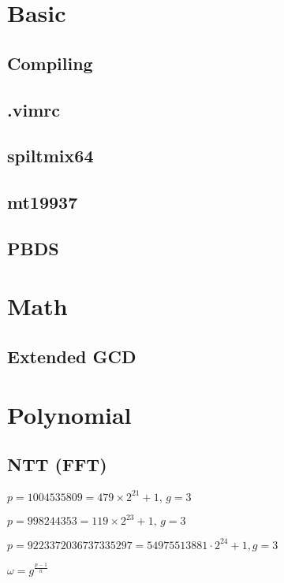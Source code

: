 \documentclass[10pt,a4paper,twocolumn,oneside]{article}
\begin{document}
	\footnotesize
	\setcounter{section}{-1}

	\section{Basic}
		\subsection{Compiling}
			
		\subsection{.vimrc}
			
		\subsection{spiltmix64}
			
		\subsection{mt19937}
			
		\subsection{PBDS}
			

	\section{Math}
		\subsection{Extended GCD}
			

	\section{Polynomial}
		\subsection{NTT (FFT)}
			
			$p = 1004535809 = 479 \times 2^{21} + 1,\,g = 3$\par
			$p = 998244353 = 119 \times 2^{23} + 1,\,g = 3$\par
			$p = 9223372036737335297 = 54975513881 \cdot 2^{24} + 1, g = 3$\par
			$\omega = g^{\frac{p-1}{n}}$
\end{document}
